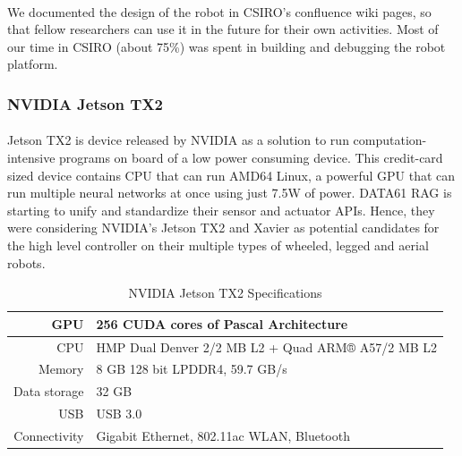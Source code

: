 \paragraph{}
We documented the design of the robot in CSIRO's confluence wiki pages, so that fellow researchers can use it in the future for their own activities. Most of our time in CSIRO (about 75\%) was spent in building and debugging the robot platform. 


\subsubsection{NVIDIA Jetson TX2}

\paragraph{}
Jetson TX2 is device released by NVIDIA as a solution to run computation-intensive programs on board of a low power consuming device. This credit-card sized device contains CPU that can run AMD64 Linux, a powerful GPU that can run multiple neural networks at once using just 7.5W of power. DATA61 RAG is starting to unify and standardize their sensor and actuator APIs. Hence, they were considering NVIDIA's Jetson TX2 and Xavier as potential candidates for the high level controller on their multiple types of wheeled, legged and aerial robots.



\begin{table}[H]
    \begin{center}
        \caption {NVIDIA Jetson TX2 Specifications} \label{tab:jetson}
        \begin{tabular}{|| r || l ||}    
            \hline
            GPU             & 256 CUDA cores of Pascal Architecture \\
            \hline
            CPU             & HMP Dual Denver 2/2 MB L2 + Quad ARM® A57/2 MB L2 \\
            \hline
            Memory          & 8 GB 128 bit LPDDR4, 59.7 GB/s \\
            \hline
            Data storage    & 32 GB \\
            \hline 
            USB             & USB 3.0 \\
            \hline 
            Connectivity    & Gigabit Ethernet, 802.11ac WLAN, Bluetooth \\
            \hline   
        \end{tabular}    
    \end{center}
\end{table}

